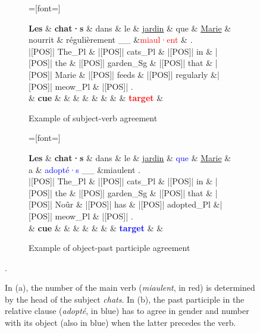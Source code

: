 \begin{figure}[!ht]
  \centering
  \begin{subfigure}[b]{\textwidth}
    \centering
    \begin{dependency}
      =[font=\fontsize{9}{11}\selectfont]
      \begin{deptext}
        \textbf{Les} \& \textbf{chat·s} \& dans \&  le \& \underline{jardin} \& que \& \underline{Marie} \& nourrit \& régulièrement \_\_ \&\textcolor{red}{miaul·ent} \& .\\
         |[POS]| The\_Pl \& |[POS]| cats\_Pl \& |[POS]| in \& |[POS]| the \& |[POS]| garden\_Sg \& |[POS]| that \& |[POS]| Marie \& |[POS]| feeds \& |[POS]| regularly \&|[POS]| meow\_Pl \& |[POS]| . \\
          \& {\bf cue} \&  \&  \&  \&  \& \& \&   \& \textcolor{red}{\bf target} \&  \\
      \end{deptext}
    \end{dependency}
    \caption{Example of subject-verb agreement}
    \label{fig:ex-subj-v}
    \end{subfigure}%
  
  \vspace{0.5cm}
  \begin{subfigure}[b]{\textwidth}
    \centering
    \begin{dependency}
      =[font=\fontsize{9}{11}\selectfont]
      \begin{deptext}
        \textbf{Les} \& \textbf{chat·s} \& dans \&  le \& \underline{jardin} \& \textcolor{blue}{que} \& \underline{Marie} \& a \& \textcolor{blue}{adopté·s} \_\_ \&miaulent .\\
         |[POS]| The\_Pl \& |[POS]| cats\_Pl \& |[POS]| in \& |[POS]| the \& |[POS]| garden\_Sg \& |[POS]| that \& |[POS]| Noûr \& |[POS]| has \& |[POS]| adopted\_Pl \&|[POS]| meow\_Pl \& |[POS]| . \\
          \& {\bf cue} \&  \&  \&  \&  \& \& \& \textcolor{blue}{\bf target}  \&  \&  \\
      \end{deptext}
    \end{dependency}
    \caption{Example of object-past participle agreement}
    \label{fig:ex-obj-pp}
  \end{subfigure}
  \caption{In (a), the number of the main verb (\textit{miaulent}, in red) is determined by the head of the subject \textit{chats}.  In (b), the past participle in the relative clause (\textit{adopté}, in blue) has to agree in gender and number with its object (also in blue) when the latter precedes the verb. }.
  \label{fig:ex_agreement}
\end{figure}


